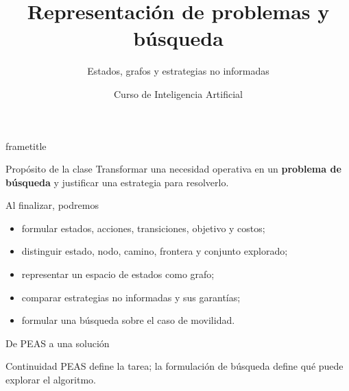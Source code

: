 \documentclass[aspectratio=169,11pt]{beamer}
\title[IA · Clase 2]{Representación de problemas y búsqueda}
\subtitle{Estados, grafos y estrategias no informadas}
\author{Curso de Inteligencia Artificial}
\institute{Semana 2 · Clase 2}
\date{}
\newcommand{\concepto}[1]{\textcolor{UAPTeal}{\textbf{#1}}}
\begin{document}
\begin{frame}[plain]
  \begin{beamercolorbox}[wd=\paperwidth,ht=\paperheight,sep=2em]{frametitle}
    \vfill {\Huge\bfseries\inserttitle\par}\vspace{.5em}
    {\color{UAPGold}\Large\insertsubtitle\par}\vspace{2em}
    {\color{white}\large\insertauthor\par\insertinstitute\par}\vfill
  \end{beamercolorbox}
\end{frame}

\begin{frame}{Propósito de la clase}
  Transformar una necesidad operativa en un \concepto{problema de búsqueda} y justificar una estrategia para resolverlo.
  \begin{block}{Al finalizar, podremos}
    \begin{itemize}
      \item formular estados, acciones, transiciones, objetivo y costos;
      \item distinguir estado, nodo, camino, frontera y conjunto explorado;
      \item representar un espacio de estados como grafo;
      \item comparar estrategias no informadas y sus garantías;
      \item formular una búsqueda sobre el caso de movilidad.
    \end{itemize}
  \end{block}
\end{frame}

\begin{frame}{De PEAS a una solución}
  \centering
  \vfill
  \begin{block}{Continuidad}
    PEAS define la tarea; la formulación de búsqueda define qué puede explorar el algoritmo.
  \end{block}
\end{frame}
\end{document}
